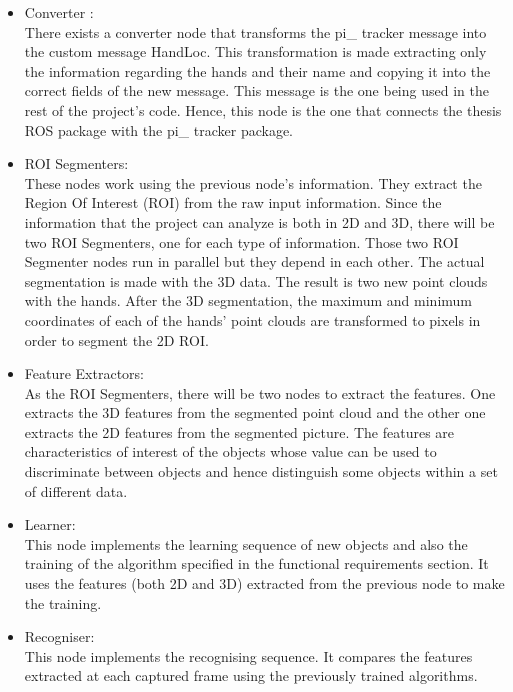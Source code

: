 \documentclass{article}
\begin{document}
\begin{itemize}
\item Converter : \\
There exists a converter node that transforms the pi\_ tracker message into the custom message HandLoc. This transformation is made extracting only the information regarding the hands and their name and copying it into the correct fields of the new message. 
This message is the one being used in the rest of the project's code. Hence, this node is the one that connects the thesis ROS package with the pi\_ tracker package.

\item ROI Segmenters:\\ 
These nodes work using the previous node's information. They extract the Region Of Interest (ROI) from the raw input information. Since the information that the project can analyze is both in 2D and 3D, there will be two ROI Segmenters, one for each type of information. 
Those two ROI Segmenter nodes run in parallel but they depend in each other. The actual segmentation is made with the 3D data. The result is two new point clouds with the hands.
After the 3D segmentation, the maximum and minimum coordinates of each of the hands' point clouds are transformed to pixels in order to segment the 2D ROI. 

\item Feature Extractors: \\
As the ROI Segmenters, there will be two nodes to extract the features. One extracts the 3D features from the segmented point cloud and the other one extracts the 2D features from the segmented picture. 
The features are characteristics of interest of the objects whose value can be used to discriminate between objects and hence distinguish some objects within a set of different data. 


\item Learner: \\
This node implements the learning sequence of new objects and also the training of the algorithm specified in the functional requirements section. 
It uses the features (both 2D and 3D) extracted from the previous node to make the training. 

\item Recogniser:\\ 
This node implements the recognising sequence. It compares the features extracted at each captured frame using the previously trained algorithms. 
\end{itemize}
   
\end{document}
